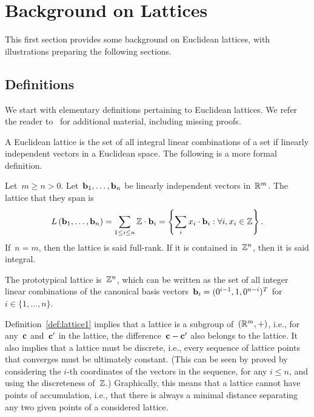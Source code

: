 \section{Background on Lattices}
\label{se:back}



This first section provides some background on Euclidean lattices, with illustrations
preparing the following sections.  


\subsection{Definitions}

We start with elementary definitions pertaining to Euclidean lattices. 
We refer the reader to~\cite{Siegel89} for additional material, including missing proofs.


A Euclidean lattice is the set of all integral linear combinations of a set if linearly independent vectors in a Euclidean space. 
The following is a more formal definition.

\begin{definition}
\label{def:lattice1}
Let~$m\geq n >0$. Let~${\bf b}_1, \ldots, {\bf b}_n$ be linearly independent vectors in~$\mathbb{R}^m$.
The lattice that they span is
\[
 L\left({\bf b}_1, \ldots, {\bf b}_n\right) = \sum_{1 \leq i \leq n} \mathbb{Z} \cdot {\bf b}_i = \left\{\sum_i x_i \cdot {\bf b}_i: \forall i, x_i \in \mathbb{Z}\right\}. 
\]
If~$n=m$, then the lattice is said full-rank. If it is contained in~$\mathbb{Z}^n$, then it is said integral. 
\end{definition}

The prototypical lattice is~$\mathbb{Z}^n$, which can be written as the set of all integer linear combinations
of the canonical basis vectors~${\bf b}_i = (0^{i-1}, 1, 0^{n-i})^T$ for~$i \in \{1,\ldots,n\}$.  

Definition~\ref{def:lattice1} implies that a lattice is a subgroup of~$(\mathbb{R}^m,+)$, i.e., for any~${\bf c}$ and~${\bf c}'$ in the lattice, the difference~${\bf c} - {\bf c}'$ also belongs to the lattice. It also implies that a lattice must be discrete, i.e., every sequence of lattice points that converges must be ultimately constant. (This can be seen by proved by considering the $i$-th coordinates of 
the vectors in the sequence, for any $i \leq n$, and using the discreteness of~$\mathbb{Z}$.)  Graphically, this means that 
a lattice cannot have points of accumulation, i.e., that there is always a minimal distance separating any two given points of a
considered lattice. %

